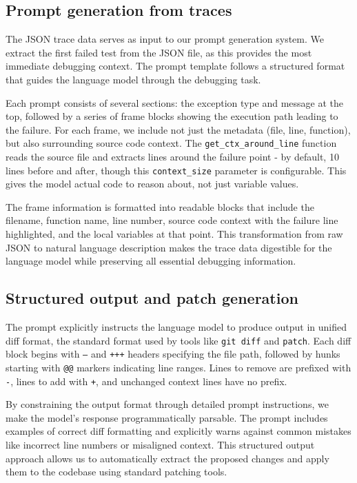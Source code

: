 \subsection{Prompt generation from traces}

The JSON trace data serves as input to our prompt generation system. We extract the first failed test from the JSON file, as this provides the most immediate debugging context. The prompt template follows a structured format that guides the language model through the debugging task.

Each prompt consists of several sections: the exception type and message at the top, followed by a series of frame blocks showing the execution path leading to the failure. For each frame, we include not just the metadata (file, line, function), but also surrounding source code context. The \texttt{get\_ctx\_around\_line} function reads the source file and extracts lines around the failure point - by default, 10 lines before and after, though this \texttt{context\_size} parameter is configurable. This gives the model actual code to reason about, not just variable values.

The frame information is formatted into readable blocks that include the filename, function name, line number, source code context with the failure line highlighted, and the local variables at that point. This transformation from raw JSON to natural language description makes the trace data digestible for the language model while preserving all essential debugging information.

\subsection{Structured output and patch generation}

The prompt explicitly instructs the language model to produce output in unified diff format, the standard format used by tools like \texttt{git diff} and \texttt{patch}. Each diff block begins with \texttt{---} and \texttt{+++} headers specifying the file path, followed by hunks starting with \texttt{@@} markers indicating line ranges. Lines to remove are prefixed with \texttt{-}, lines to add with \texttt{+}, and unchanged context lines have no prefix.

By constraining the output format through detailed prompt instructions, we make the model's response programmatically parsable. The prompt includes examples of correct diff formatting and explicitly warns against common mistakes like incorrect line numbers or misaligned context. This structured output approach allows us to automatically extract the proposed changes and apply them to the codebase using standard patching tools.


